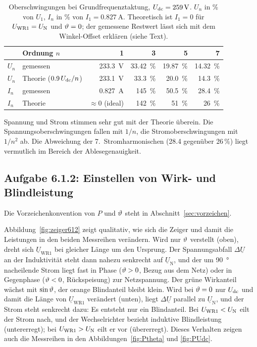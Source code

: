 \begin{table}[htbp]
  \centering
  \caption{Oberschwingungen bei Grundfrequenztaktung, $U_{\mathrm{dc}}=\SI{259}{\volt}$. $U_n$ in \% von $U_1$, $I_n$ in \% von $I_1=\SI{0.827}{\ampere}$. Theoretisch ist $I_1=0$ für $U_{\mathrm{WR1}}=U_{\mathrm{N}}$ und $\vartheta=0$; der gemessene Restwert lässt sich mit dem Winkel-Offset erklären (siehe Text).}
  \label{tab:611}
  \begin{tabular}{@{}llrrrr@{}}
    \toprule
    & Ordnung $n$ & 1 & 3 & 5 & 7 \\
    \midrule
    $U_n$ & gemessen & \SI{233.3}{\volt} & \SI{33.42}{\percent} & \SI{19.87}{\percent} & \SI{14.32}{\percent} \\
    $U_n$ & Theorie ($0.9\,U_{\mathrm{dc}}/n$) & \SI{233.1}{\volt} & \SI{33.3}{\percent} & \SI{20.0}{\percent} & \SI{14.3}{\percent} \\
    \midrule
    $I_n$ & gemessen & \SI{0.827}{\ampere} & \SI{145}{\percent} & \SI{50.5}{\percent} & \SI{28.4}{\percent} \\
    $I_n$ & Theorie & $\approx0$ (ideal) & \SI{142}{\percent} & \SI{51}{\percent} & \SI{26}{\percent} \\
    \bottomrule
  \end{tabular}
\end{table}

Spannung und Strom stimmen sehr gut mit der Theorie überein. Die Spannungsoberschwingungen fallen mit $1/n$, die Stromoberschwingungen mit $1/n^2$ ab. Die Abweichung der 7.\ Stromharmonischen (28.4 gegenüber 26\,\%) liegt vermutlich im Bereich der Ablesegenauigkeit.

\subsection{Aufgabe 6.1.2: Einstellen von Wirk- und Blindleistung}
\label{sec:messung612}

Die Vorzeichenkonvention von $P$ und $\vartheta$ steht in Abschnitt~\ref{sec:vorzeichen}.

Abbildung~\ref{fig:zeiger612} zeigt qualitativ, wie sich die Zeiger und damit die Leistungen in den beiden Messreihen verändern. Wird nur $\vartheta$ verstellt (oben), dreht sich $\underline U_{\mathrm{WR1}}$ bei gleicher Länge um den Ursprung. Der Spannungsabfall $\Delta\underline U$ an der Induktivität steht dann nahezu senkrecht auf $\underline U_{\mathrm N}$, und der um \SI{90}{\degree} nacheilende Strom liegt fast in Phase ($\vartheta>0$, Bezug aus dem Netz) oder in Gegenphase ($\vartheta<0$, Rückspeisung) zur Netzspannung. Der grüne Wirkanteil wächst mit $\sin\vartheta$, der orange Blindanteil bleibt klein. Wird bei $\vartheta=0$ nur $U_{\mathrm{dc}}$ und damit die Länge von $\underline U_{\mathrm{WR1}}$ verändert (unten), liegt $\Delta\underline U$ parallel zu $\underline U_{\mathrm N}$, und der Strom steht senkrecht dazu: Es entsteht nur ein Blindanteil. Bei $U_{\mathrm{WR1}}<U_{\mathrm{N}}$ eilt der Strom nach, und der Wechselrichter bezieht induktive Blindleistung (untererregt); bei $U_{\mathrm{WR1}}>U_{\mathrm{N}}$ eilt er vor (übererregt). Dieses Verhalten zeigen auch die Messreihen in den Abbildungen~\ref{fig:Ptheta} und \ref{fig:PUdc}.

